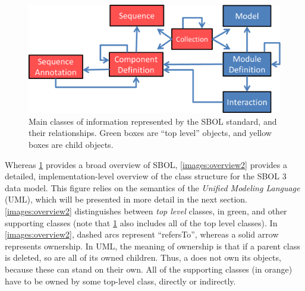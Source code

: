 \begin{figure}[ht]
\begin{center}
  \includegraphics[scale=0.7]{images/OverviewFigforSpec-v7.png}
\caption{Main classes of information represented by the SBOL standard, and their relationships.  Green boxes are ``top level'' objects, and yellow boxes are child objects.}
\label{images:overview1}
\end{center}
\end{figure}

Whereas \ref{images:overview1} provides a broad overview of SBOL, \ref{images:overview2} provides a detailed, implementation-level overview of the class structure for the SBOL 3 data model. This figure relies on the semantics of the \emph{Unified Modeling Language} (UML), which will be presented in more detail in the next section. \ref{images:overview2} distinguishes between \emph{top level} classes, in green, and other supporting classes (note that \ref{images:overview1} also includes all of the top level classes). In \ref{images:overview2}, dashed arcs represent ``refersTo'', whereas a solid arrow represents ownership. In UML, the meaning of ownership is that if a parent class is deleted, so are all of its owned children. Thus, a  does not own its  objects, because these can stand on their own. All of the supporting classes (in orange) have to be owned by some top-level class, directly or indirectly. 


